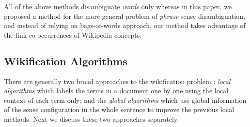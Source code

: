 All of the above methods disambiguate {\em words} only whereas
in this paper, we proposed a method for the more general problem of
{\em phrase} sense disambiguation,
and instead of relying on bags-of-words approach,
our method takes advantage of the link co-occurrences of Wikipedia concepts.

\subsection{Wikification Algorithms}
There are generally two broad approaches to the wikification problem
\cite{RatinovRDA11}:
{\em local algorithms} which labels the terms in a document one by one
using the local context of each term only;
and the {\em global algorithms} which use global information of
the sense configuration in the whole sentence
to improve the previous local methods.
Next we discuss these two approaches separately.

